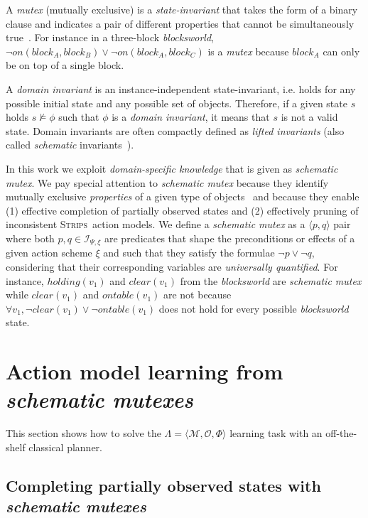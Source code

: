 \documentclass{article}
\newcommand{\tup}[1]{{\langle #1 \rangle}}
\newcommand{\strips}{\textsc{Strips}}
\begin{document}
A {\em mutex} (mutually exclusive) is a {\em state-invariant} that takes the form of a binary clause and indicates a pair of different properties that cannot be simultaneously true~\cite{kautz:mutex:IJCAI1999}. For instance in a three-block {\em blocksworld}, $\neg on(block_A,block_B)\vee \neg on(block_A,block_C)$ is a {\em mutex} because $block_A$ can only be on top of a single block.

A {\em domain invariant} is an instance-independent state-invariant, i.e. holds for any possible initial state and any possible set of objects. Therefore, if a given state $s$ holds $s\nvDash \phi$ such that $\phi$ is a {\em domain invariant}, it means that $s$ is not a valid state. Domain invariants are often compactly defined as {\em lifted invariants} (also called {\em schematic} invariants~\cite{rintanen:schematicInvariants:AAAI2017}).

In this work we exploit {\em domain-specific knowledge} that is given as  {\em schematic mutex}. We pay special attention to {\em schematic mutex} because they identify mutually exclusive {\em properties} of a given type of objects~\cite{fox:TIM:JAIR1998} and because they enable (1) effective completion of partially observed states and (2) effectively pruning of inconsistent \strips\ action models.  We define a {\em schematic mutex} as a $\tup{p,q}$ pair where both $p,q\in{\mathcal I}_{\Psi,\xi}$ are predicates that shape the preconditions or effects of a given action scheme $\xi$ and such that they satisfy the formulae $\neg p\vee \neg q$, considering that their corresponding variables are {\em universally quantified}. For instance, $holding(v_1)$ and $clear(v_1)$ from the {\em blocksworld} are {\em schematic mutex} while $clear(v_1)$ and $ontable(v_1)$ are not because $\forall v_1, \neg clear(v_1)\vee\neg ontable(v_1)$ does not hold for every possible {\em blocksworld} state.


\section{Action model learning from {\em schematic mutexes}}
\label{sec:compilation}
This section shows how to solve the $\Lambda=\tup{\mathcal{M},{\mathcal O},\Phi}$ learning task with an off-the-shelf classical planner.


\subsection{Completing partially observed states with {\em schematic mutexes}}
\end{document}
